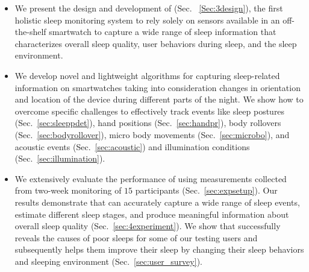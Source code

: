 \begin{itemize}[noitemsep]
	\item We present the design and development of {\systemname} (Sec. ~\ref{Sec:3design}), the first holistic sleep monitoring system to rely solely on sensors available in an off-the-shelf smartwatch to capture a wide range of sleep information that characterizes overall sleep quality, user behaviors during sleep, and the sleep environment.
	
\item We develop novel and lightweight algorithms for capturing sleep-related information on smartwatches taking into consideration changes in orientation and location of the device during different parts of the night. We show how to overcome specific challenges to effectively track events like sleep postures (Sec.~\ref{sec:sleeppdet}), hand positions (Sec.~\ref{sec:handpr}), body rollovers (Sec.~\ref{sec:bodyrollover}), micro body movements (Sec.~\ref{sec:microbo}), and acoustic events (Sec.~\ref{sec:acoustic}) and illumination conditions (Sec.~\ref{sec:illumination}).
	

    \item We extensively evaluate the performance of {\systemname} using measurements collected from two-week monitoring of $15$ participants (Sec.~\ref{sec:expsetup}). Our results demonstrate that {\systemname} can accurately capture a wide range of sleep events, estimate different sleep stages, and produce meaningful information about overall sleep quality (Sec.~\ref{sec:4experiment}).  We show that {\systemname} successfully reveals the causes of poor sleeps for some of our testing users and subsequently helps them improve their sleep by changing their sleep behaviors and sleeping environment  (Sec.~\ref{sec:user_survey}).
\end{itemize}
